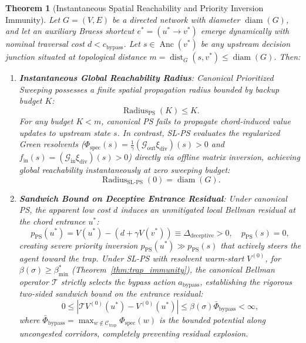 \documentclass[11pt,a4paper]{article}
\newtheorem{theorem}{Theorem}
\begin{document}
\begin{theorem}[Instantaneous Spatial Reachability and Priority Inversion Immunity]
\label{thm:sweep_efficiency}
Let $G = (V, E)$ be a directed network with diameter $\operatorname{diam}(G)$, and let an auxiliary Braess shortcut $e^* = (u^* \to v^*)$ emerge dynamically with nominal traversal cost $d < c_{\text{bypass}}$. Let $s \in \operatorname{Anc}(v^*)$ be any upstream decision junction situated at topological distance $m = \operatorname{dist}_G(s, v^*) \le \operatorname{diam}(G)$. Then:
\begin{enumerate}
    \item \textbf{Instantaneous Global Reachability Radius}: Canonical Prioritized Sweeping possesses a finite spatial propagation radius bounded by backup budget $K$:
    \begin{equation}
    \label{eq:ps_reachability_radius}
    \operatorname{Radius}_{\text{PS}}(K) \le K.
    \end{equation}
    For any budget $K < m$, canonical PS fails to propagate chord-induced value updates to upstream state $s$. In contrast, SL-PS evaluates the regularized Green resolvents ($\Phi_{\text{spec}}(s) = \frac{1}{\gamma}(\mathcal{G}_{\text{out}} \xi_{\text{div}})(s) > 0$ and $f_{\text{in}}(s) = (\mathcal{G}_{\text{in}} \xi_{\text{div}})(s) > 0$) directly via offline matrix inversion, achieving global reachability instantaneously at zero sweeping budget:
    \begin{equation}
    \label{eq:sl_reachability_radius}
    \operatorname{Radius}_{\text{SL-PS}}(0) = \operatorname{diam}(G).
    \end{equation}
    
    \item \textbf{Sandwich Bound on Deceptive Entrance Residual}: Under canonical PS, the apparent low cost $d$ induces an unmitigated local Bellman residual at the chord entrance $u^*$:
    \begin{equation}
    p_{\text{PS}}(u^*) = V(u^*) - (d + \gamma V(v^*)) \equiv \Delta_{\text{deceptive}} > 0, \quad p_{\text{PS}}(s) = 0,
    \end{equation}
    creating severe priority inversion $p_{\text{PS}}(u^*) \gg p_{\text{PS}}(s)$ that actively steers the agent toward the trap. 
    Under SL-PS with resolvent warm-start $V^{(0)}$, for $\beta(\sigma) \ge \beta_{\min}^*$ (Theorem~\ref{thm:trap_immunity}), the canonical Bellman operator $\mathcal{T}$ strictly selects the bypass action $a_{\text{bypass}}$, establishing the rigorous two-sided sandwich bound on the entrance residual:
    \begin{equation}
    \label{eq:chord_residual_sandwich}
    0 \le |\mathcal{T} V^{(0)}(u^*) - V^{(0)}(u^*)| \le \beta(\sigma) \bar{\Phi}_{\text{bypass}} < \infty,
    \end{equation}
    where $\bar{\Phi}_{\text{bypass}} = \max_{w \notin \mathcal{C}_{\text{trap}}} \Phi_{\text{spec}}(w)$ is the bounded potential along uncongested corridors, completely preventing residual explosion.


\end{enumerate}
\end{theorem}
\end{document}
